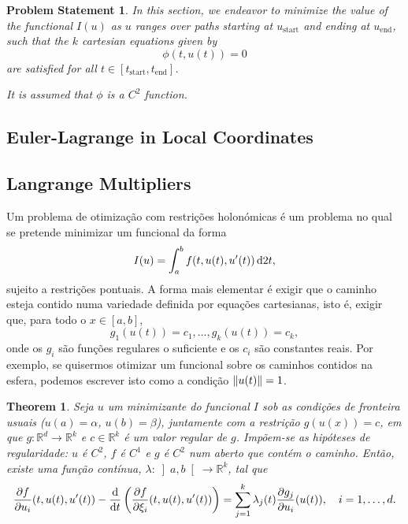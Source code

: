 \documentclass{article}
\newtheorem{theorem}{Theorem}
\theoremstyle{nonumberplain}
\theoremstyle{nonumberplain}
\newtheorem{statement}{Problem Statement}
\newcommand{\R}{\mathbb{R}}
\newcommand{\tstart}{\mathrm{start}}
\newcommand{\tend}{\mathrm{end}}
\DeclarePairedDelimiter\norm{\lVert}{\rVert}
\begin{document}
\begin{statement}
In this section, we endeavor to minimize the value of the functional $I(u)$ as $u$ ranges over paths starting at $u_\tstart$ and ending at $u_\tend$, such that the $k$ cartesian equations given by
\[\phi(t, u(t)) = 0\]
are satisfied for all $t \in [t_\tstart, t_\tend]$.

It is assumed that $\phi$ is a $C^2$ function.
\end{statement}

\subsection{Euler-Lagrange in Local Coordinates}

\subsection{Langrange Multipliers}

Um problema de otimização com restrições holonómicas é um problema no qual se pretende minimizar um funcional da forma
\[I(u) = \int_a^b f(t,u(t),u'(t)) \dl2 t,\]
sujeito a restrições pontuais. A forma mais elementar é exigir que o caminho esteja contido numa variedade definida por equações cartesianas, isto é, exigir que, para todo o $x \in [a,b]$,
\[g_1(u(t)) = c_1, \dots, g_k(u(t)) = c_k,\]
onde os $g_i$ são funções regulares o suficiente e os $c_i$ são constantes reais. Por exemplo, se quisermos otimizar um funcional sobre os caminhos contidos na esfera, podemos escrever isto como a condição $\norm{u(t)} = 1$.

\begin{theorem}
Seja $u$ um minimizante do funcional $I$ sob as condições de fronteira usuais ($u(a) = \alpha$, $u(b) = \beta$), juntamente com a restrição $g(u(x)) = c$, em que $g \colon \R^d \to \R^k$ e $c \in \R^k$ é um valor regular de $g$. Impõem-se as hipóteses de regularidade: $u$ é $C^2$, $f$ é $C^1$ e $g$ é $C^2$ num aberto que contém o caminho. Então, existe uma função contínua, $\lambda \colon \left]a,b\right[ \to \R^k$, tal que
\[\diffp f {u_i}(t,u(t),u'(t)) - \diff*{\left(\diffp f {\xi_i}(t,u(t),u'(t))\right)}t = \sum_{j=1}^k \lambda_j(t) \diffp {g_j} {u_i} (u(t)), \quad i = 1, \dots, d.\]
\end{theorem}
\end{document}
